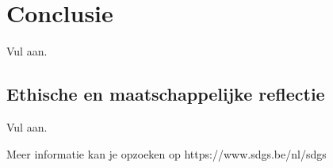 \chapter*{Conclusie}


Vul aan.


\lipsum[2-4]

\section*{Ethische en maatschappelijke reflectie}

Vul aan.

Meer informatie kan je opzoeken op https://www.sdgs.be/nl/sdgs


\lipsum[2-4]
